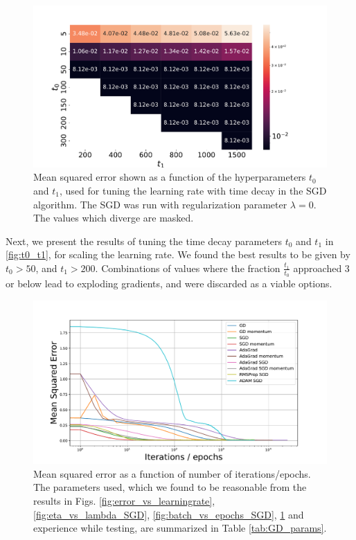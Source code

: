 \documentclass[12pt]{article}
\begin{document}
\begin{figure}
    \centering
    \includegraphics[width=0.91\linewidth]{images/t0_t1.pdf}
    \caption{Mean squared error shown as a function of the hyperparameters $t_0$ and $t_1$, used for tuning the learning rate with time decay in the SGD algorithm. The SGD was run with regularization parameter $\lambda = 0$. The values which diverge are masked.}
    \label{fig:t0_t1}
\end{figure}

Next, we present the results of tuning the time decay parameters $t_0$ and $t_1$ in \autoref{fig:t0_t1}, for scaling the learning rate. We found the best results to be given by $t_0 > 50$, and $t_1 > 200$. Combinations of values where the fraction $\frac{t_1}{t_0}$ approached 3 or below lead to exploding gradients, and were discarded as a viable options. 

\begin{figure}
    \centering
    \includegraphics[width=0.91\linewidth]{images/error_vs_iteration_semilogx.pdf}
    \caption{Mean squared error as a function of number of iterations/epochs. The parameters used, which we found to be reasonable from the results in Figs. \ref{fig:error_vs_learningrate}, \ref{fig:eta_vs_lambda_SGD}, \ref{fig:batch_vs_epochs_SGD}, \ref{fig:t0_t1} and experience while testing, are summarized in Table \ref{tab:GD_params}.}
    \label{fig:error_vs_iteration_semilogx}
\end{figure}
\end{document}
